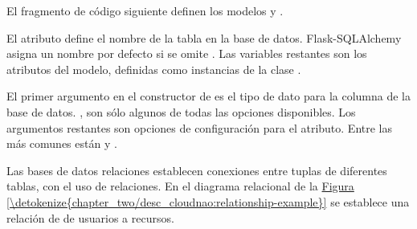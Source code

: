 El fragmento de código siguiente definen los modelos  y .

\begin{sphinxVerbatim}[commandchars=\\\{\}]
 
    
     
      
    
 
    
     
    
\end{sphinxVerbatim}

El atributo   define el nombre de la tabla en la base de datos.
Flask-SQLAlchemy asigna un nombre por defecto si se omite .
Las variables restantes son los atributos del modelo, definidas como instancias
de la clase .

El primer argumento en el constructor de  es el tipo de dato
para la columna de la base de datos. , son
sólo algunos de todas las opciones disponibles.
Los argumentos restantes son opciones de configuración para el atributo. Entre
las más comunes están  y  .


Las bases de datos relaciones establecen conexiones entre tuplas de diferentes
tablas, con el uso de relaciones. En el diagrama relacional de la \hyperref[\detokenize{chapter_two/desc_cloudnao:relationship-example}]{Figura \ref{\detokenize{chapter_two/desc_cloudnao:relationship-example}}}
se establece una relación de  de usuarios a recursos.

